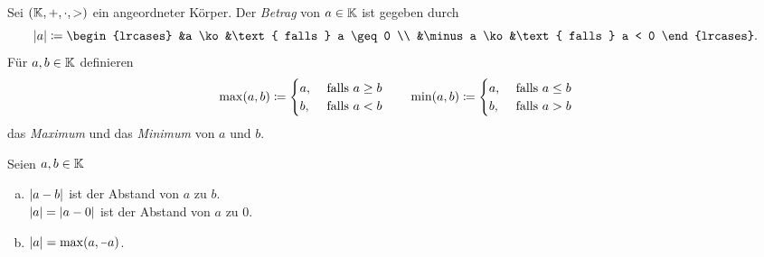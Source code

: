 \documentclass[../ana1.tex]{subfiles}
\begin{document}
\begin{defi}[Betrag]
	Sei \((\mathbb{K} , + , \cdot , >) \) ein angeordneter Körper. Der \textit{Betrag} von 
	\(a \in \mathbb{K} \) ist gegeben durch
	\[\abs{a} \coloneqq
		\begin{lrcases}
			&a \ko  &\text{ falls } a \geq 0  \\
			&\minus a \ko &\text{ falls } a < 0
		\end{lrcases}. \]
	Für \(a , b \in \mathbb{K} \) definieren
	\[\max(a , b) \coloneqq
		\begin{cases}
			a , &\text{ falls } a \geq b  \\
			b , &\text{ falls } a < b
		\end{cases}
		\qquad
	  \min(a , b) \coloneqq
		\begin{cases}
			a , &\text{ falls } a \leq b  \\
			b , &\text{ falls } a > b
		\end{cases} \]
	das \textit{Maximum} und das \textit{Minimum} von \(a \) und \(b \).
\end{defi}

\begin{bem}\label{bem:abstand}
	Seien \(a , b \in \mathbb{K} \)
	\begin{enumerate}[(a)]
		\item \(\left|a - b\right| \) ist der Abstand von \(a \) zu \(b \). \\
		      \(\left|a\right| = \left|a - 0\right| \) ist der Abstand von \(a \) zu \(0 \).
		\item \(\abs{a} = \max(a \ko \minus a) \).
	\end{enumerate}
\end{bem}

\iftoggle{short}{}{\newpage}%
\end{document}
